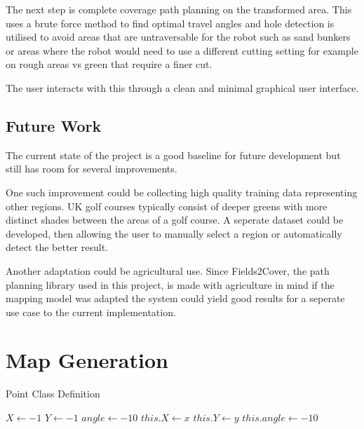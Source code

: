 \documentclass[final]{cmpreport_02}
\begin{document}
The next step is complete coverage path planning on the transformed area.
This uses a brute force method to find optimal travel angles and hole detection is utilised to avoid areas that are untraversable for the robot such as sand bunkers or areas where the robot would need to use a different cutting setting for example on rough areas vs green that require a finer cut.

The user interacts with this through a clean and minimal graphical user interface.


\subsection{Future Work}

The current state of the project is a good baseline for future development but still has room for several improvements.

One such improvement could be collecting high quality training data representing other regions. UK golf courses typically consist of deeper greens with more distinct shades between the areas of a golf course. A seperate dataset could be developed, then allowing the user to manually select a region or automatically detect the better result.

Another adaptation could be agricultural use. 
Since Fields2Cover, the path planning library used in this project, is made with agriculture in mind if the mapping model was adapted the system could yield good results for a seperate use case to the current implementation.



\clearpage



\appendix
\clearpage

\section{Map Generation}

\begin{algorithm}[h!]
	\caption{Point Class Definition}
	\label{mg:point class}
	\begin{algorithmic}[1]
		\State $X \gets -1$ 
		\State $Y \gets -1$ 
		\State $angle \gets -10$ 
		\State $this.X \gets x$
		\State $this.Y \gets y$
		\State $this.angle \gets -10$ 
		\EndProcedure
		\EndProcedure
	\end{algorithmic}
\end{algorithm}
\end{document}

